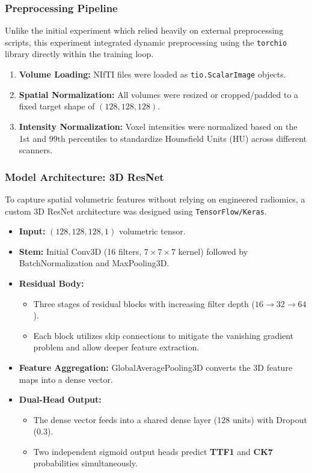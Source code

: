 \subsubsection{Preprocessing Pipeline}
Unlike the initial experiment which relied heavily on external preprocessing scripts, this experiment integrated dynamic preprocessing using the \texttt{torchio} library directly within the training loop.
\begin{enumerate}
    \item \textbf{Volume Loading:} NIfTI files were loaded as \texttt{tio.ScalarImage} objects.
    \item \textbf{Spatial Normalization:} All volumes were resized or cropped/padded to a fixed target shape of \textbf{$(128, 128, 128)$}.
    \item \textbf{Intensity Normalization:} Voxel intensities were normalized based on the 1st and 99th percentiles to standardize Hounsfield Units (HU) across different scanners.
\end{enumerate}

\subsubsection{Model Architecture: 3D ResNet}
To capture spatial volumetric features without relying on engineered radiomics, a custom 3D ResNet architecture was designed using \texttt{TensorFlow/Keras}.

\begin{itemize}
    \item \textbf{Input:} $(128, 128, 128, 1)$ volumetric tensor.
    \item \textbf{Stem:} Initial Conv3D (16 filters, $7\times7\times7$ kernel) followed by BatchNormalization and MaxPooling3D.
    \item \textbf{Residual Body:}
    \begin{itemize}
        \item Three stages of residual blocks with increasing filter depth ($16 \rightarrow 32 \rightarrow 64$).
        \item Each block utilizes skip connections to mitigate the vanishing gradient problem and allow deeper feature extraction.
    \end{itemize}
    \item \textbf{Feature Aggregation:} GlobalAveragePooling3D converts the 3D feature maps into a dense vector.
    \item \textbf{Dual-Head Output:}
    \begin{itemize}
        \item The dense vector feeds into a shared dense layer (128 units) with Dropout (0.3).
        \item Two independent sigmoid output heads predict \textbf{TTF1} and \textbf{CK7} probabilities simultaneously.
    \end{itemize}
\end{itemize}

